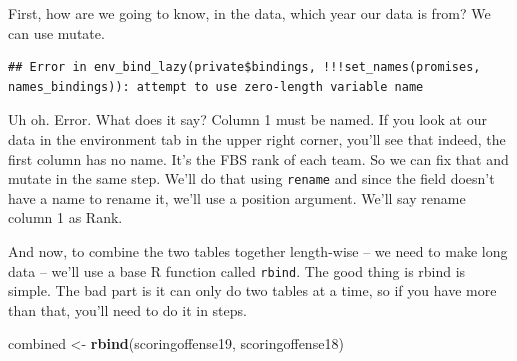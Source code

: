 \documentclass[
]{book}
\newenvironment{Shaded}{\begin{snugshade}}{\end{snugshade}}
\newcommand{\DataTypeTok}[1]{\textcolor[rgb]{0.13,0.29,0.53}{#1}}
\newcommand{\DecValTok}[1]{\textcolor[rgb]{0.00,0.00,0.81}{#1}}
\newcommand{\KeywordTok}[1]{\textcolor[rgb]{0.13,0.29,0.53}{\textbf{#1}}}
\newcommand{\NormalTok}[1]{#1}
\newcommand{\OperatorTok}[1]{\textcolor[rgb]{0.81,0.36,0.00}{\textbf{#1}}}
\newcommand{\StringTok}[1]{\textcolor[rgb]{0.31,0.60,0.02}{#1}}
\begin{document}
First, how are we going to know, in the data, which year our data is from? We can use mutate.

\begin{Shaded}
\end{Shaded}

\begin{verbatim}
## Error in env_bind_lazy(private$bindings, !!!set_names(promises, names_bindings)): attempt to use zero-length variable name
\end{verbatim}

Uh oh. Error. What does it say? Column 1 must be named. If you look at our data in the environment tab in the upper right corner, you'll see that indeed, the first column has no name. It's the FBS rank of each team. So we can fix that and mutate in the same step. We'll do that using \texttt{rename} and since the field doesn't have a name to rename it, we'll use a position argument. We'll say rename column 1 as Rank.

\begin{Shaded}
\end{Shaded}

And now, to combine the two tables together length-wise -- we need to make long data -- we'll use a base R function called \texttt{rbind}. The good thing is rbind is simple. The bad part is it can only do two tables at a time, so if you have more than that, you'll need to do it in steps.

\begin{Shaded}
\begin{Highlighting}[]
\NormalTok{combined <-}\StringTok{ }\KeywordTok{rbind}\NormalTok{(scoringoffense19, scoringoffense18)}
\end{Highlighting}
\end{Shaded}
\end{document}
